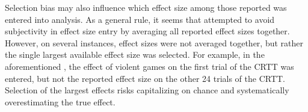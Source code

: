 \documentclass[man]{apa6}
\begin{document}
Selection bias may also influence which effect size among those reported was entered into analysis. As a general rule, it seems that \citet{Anderson:etal:2010} attempted to avoid subjectivity in effect size entry by averaging all reported effect sizes together. However, on several instances, effect sizes were not averaged together, but rather the single largest available effect size was selected. For example, in the aforementioned \citet[study 2]{Anderson:etal:2004}, the effect of violent games on the first trial of the CRTT was entered, but not the reported effect size on the other 24 trials of the CRTT. %
Selection of the largest effects risks capitalizing on chance and systematically overestimating the true effect.
\end{document}
